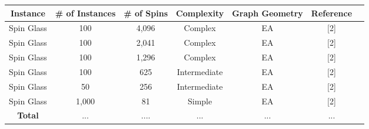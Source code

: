 \documentclass{standalone}
\begin{document}
\begin{tabular}{ |c|c|c|c|c|c|c| } 
    \hline
    \textbf{Instance} & \textbf{\# of Instances} & \textbf{\# of Spins} & \textbf{Complexity} & \textbf{Graph Geometry} & \textbf{Reference}\\ 
    \hline
    Spin Glass & 100 & 4,096 & Complex & EA & [2] \\
    Spin Glass & 100 & 2,041 & Complex & EA & [2] \\
    Spin Glass & 100 & 1,296 & Complex & EA & [2] \\
    Spin Glass & 100 & 625 & Intermediate & EA & [2] \\
    Spin Glass & 50 & 256 & Intermediate & EA & [2] \\
    Spin Glass & 1,000 & 81 & Simple & EA & [2] \\
    \hline
    \textbf{Total} & ... & .... & ... & ... & ... \\
    \hline
\end{tabular}
\end{document}
